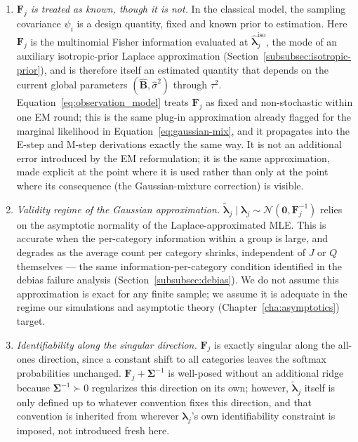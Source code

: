 \begin{enumerate}
\item[(A1)] \emph{$\mathbf F_j$ is treated as known, though it is not.} In the classical model, the sampling covariance $\psi_i$ is a design quantity, fixed and known prior to estimation. Here $\mathbf F_j$ is the multinomial Fisher information evaluated at $\hat{\bm\lambda}_j^{\text{iso}}$, the mode of an auxiliary isotropic-prior Laplace approximation (Section~\ref{subsubsec:isotropic-prior}), and is therefore itself an estimated quantity that depends on the current global parameters $(\hat{\mathbf{B}},\hat\sigma^2)$ through $\tau^2$. Equation~\eqref{eq:observation_model} treats $\mathbf F_j$ as fixed and non-stochastic within one EM round; this is the same plug-in approximation already flagged for the marginal likelihood in Equation~\eqref{eq:gaussian-mix}, and it propagates into the E-step and M-step derivations exactly the same way. It is not an additional error introduced by the EM reformulation; it is the same approximation, made explicit at the point where it is used rather than only at the point where its consequence (the Gaussian-mixture correction) is visible.

\item[(A2)] \emph{Validity regime of the Gaussian approximation.} $\tilde{\bm\lambda}_j\mid\bm\lambda_j\sim\mathcal N(\bm 0,\mathbf F_j^{-1})$ relies on the asymptotic normality of the Laplace-approximated MLE. This is accurate when the per-category information within a group is large, and degrades as the average count per category shrinks, independent of $J$ or $Q$ themselves --- the same information-per-category condition identified in the debias failure analysis (Section~\ref{subsubsec:debias}). We do not assume this approximation is exact for any finite sample; we assume it is adequate in the regime our simulations and asymptotic theory (Chapter~\ref{cha:asymptotics}) target.


\item[(A4)] \emph{Identifiability along the singular direction.} $\mathbf F_j$ is exactly singular along the all-ones direction, since a constant shift to all categories leaves the softmax probabilities unchanged. $\mathbf F_j+\bm\Sigma^{-1}$ is well-posed without an additional ridge because $\bm\Sigma^{-1}\succ0$ regularizes this direction on its own; however, $\tilde{\bm\lambda}_j$ itself is only defined up to whatever convention fixes this direction, and that convention is inherited from wherever $\bm\lambda_j$'s own identifiability constraint is imposed, not introduced fresh here.


\end{enumerate}
